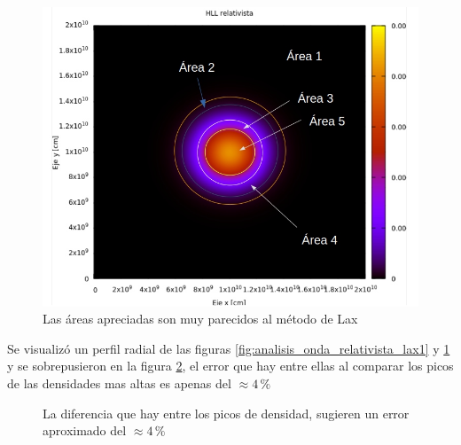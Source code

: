 \documentclass[12pt,a4paper]{book}
\begin{document}
\begin{figure}[H] \label{fig:analisis_onda_relativista_hll1}
\centering
\includegraphics[scale=0.5]{./Figuras/Pruebas/Prueba_onda_choque/Lax-HLL-rel/bwhll-rel79-analisis}
\caption{Las áreas apreciadas son muy parecidos al método de Lax}
\end{figure}

Se visualizó un perfil radial de las figuras \ref{fig:analisis_onda_relativista_lax1} y \ref{fig:analisis_onda_relativista_hll1} y se sobrepusieron en la figura \ref{fig:perfil_radial_relativista_newtoniano}, el error que hay entre ellas al comparar los picos de las densidades mas altas es apenas del $\approx 4 \, \%$

\begin{figure}[H] \label{fig:perfil_radial_relativista_newtoniano}
\centering
{}
\caption{La diferencia que hay entre los picos de densidad, sugieren un error aproximado del $\approx 4 \, \%$}
\end{figure}
\end{document}
